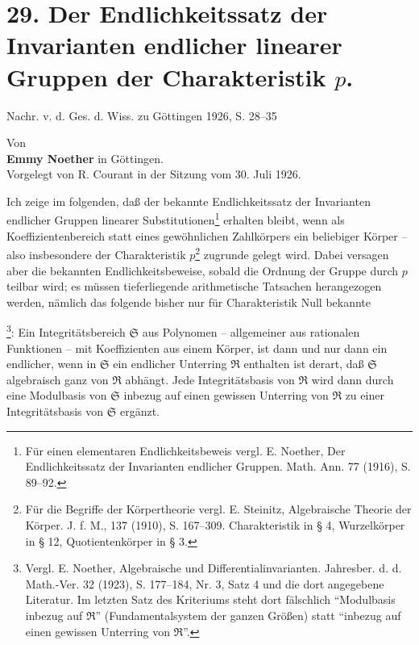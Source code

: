 \section*{29. Der Endlichkeitssatz der Invarianten endlicher linearer Gruppen der Charakteristik $p$.}

\begin{center}
Nachr. v. d. Ges. d. Wiss. zu Göttingen 1926, S. 28--35
\end{center}

\setcounter{footnote}{0}

\begin{center}
Von\\[0.5em]
\textbf{Emmy Noether} in Göttingen.\\[1em]
Vorgelegt von R. Courant in der Sitzung vom 30. Juli 1926.
\end{center}

Ich zeige im folgenden, daß der bekannte Endlichkeitssatz der Invarianten endlicher Gruppen linearer Substitutionen\footnote{Für einen elementaren Endlichkeitsbeweis vergl. E. Noether, Der Endlichkeitssatz der Invarianten endlicher Gruppen. Math. Ann. 77 (1916), S. 89--92.} erhalten bleibt, wenn als Koeffizientenbereich statt eines gewöhnlichen Zahlkörpers ein beliebiger Körper -- also insbesondere der Charakteristik $p$\footnote{Für die Begriffe der Körpertheorie vergl. E. Steinitz, Algebraische Theorie der Körper. J. f. M., 137 (1910), S. 167--309. Charakteristik in § 4, Wurzelkörper in § 12, Quotientenkörper in § 3.} zugrunde gelegt wird. Dabei versagen aber die bekannten Endlichkeitsbeweise, sobald die Ordnung der Gruppe durch $p$ teilbar wird; es müssen tieferliegende arithmetische Tatsachen herangezogen werden, nämlich das folgende bisher nur für Charakteristik Null bekannte

\footnote{Vergl. E. Noether, Algebraische und Differentialinvarianten. Jahresber. d. d. Math.-Ver. 32 (1923), S. 177--184, Nr. 3, Satz 4 und die dort angegebene Literatur. Im letzten Satz des Kriteriums steht dort fälschlich ``Modulbasis inbezug auf $\mathfrak R$'' (Fundamentalsystem der ganzen Größen) statt ``inbezug auf einen gewissen Unterring von $\mathfrak R$''.}: Ein Integritätsbereich $\mathfrak S$ aus Polynomen -- allgemeiner aus rationalen Funktionen -- mit Koeffizienten aus einem Körper, ist dann und nur dann ein endlicher, wenn in $\mathfrak S$ ein endlicher Unterring $\mathfrak R$ enthalten ist derart, daß $\mathfrak S$ algebraisch ganz von $\mathfrak R$ abhängt. Jede Integritätsbasis von $\mathfrak R$ wird dann durch eine Modulbasis von $\mathfrak S$ inbezug auf einen gewissen Unterring von $\mathfrak R$ zu einer Integritätsbasis von $\mathfrak S$ ergänzt.

